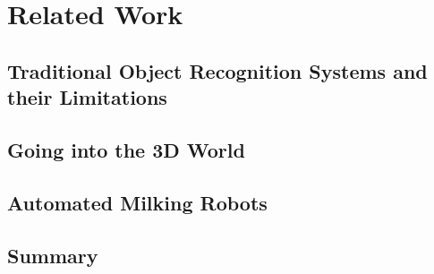 \chapter{Related Work}\label{chap:background}


\section{Traditional Object Recognition Systems and their Limitations}
\lipsum[2-5]
\section{Going into the 3D World}
\lipsum[2-5]

\section{Automated Milking Robots}
\lipsum[2-5]

\section{Summary}
\lipsum[2-5]


